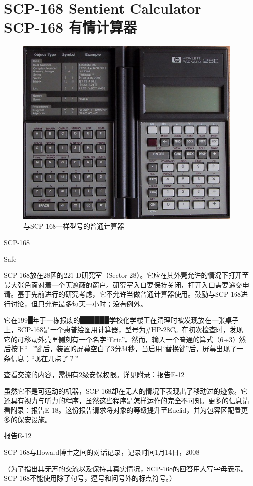 \chapter[SCP-168 有情计算器]{
    SCP-168 Sentient Calculator\\
    SCP-168 有情计算器
}

\label{chap:SCP-168}

\begin{figure}[H]
    \centering
    \includegraphics[width=0.5\linewidth]{images/SCP-168.jpg}
    \caption*{与SCP-168一样型号的普通计算器}
\end{figure}

SCP-168

Safe

SCP-168放在28区的221-D研究室（Sector-28）。它应在其外壳允许的情况下打开至最大张角面对着一个无遮蔽的窗户。研究室入口要保持关闭，打开入口需要递交申请。基于先前进行的研究考虑，它不允许当做普通计算器使用。鼓励与SCP-168进行讨论，但只允许最多每天一小时；没有例外。

它在199█年于一栋报废的██████学校化学楼正在清理时被发现放在一张桌子上，SCP-168是一个惠普绘图用计算器，型号为\#HP-28C。在初次检查时，发现它的可移动外壳里侧刻有一个名字“Eric”。然而，输入一个普通的算式（6÷3）然后按下“=”键后，装置的屏幕空白了3分34秒，当启用“替换键”后，屏幕出现了一条信息；“现在几点了？”

查看交流的内容，需拥有2级安保权限。详见附录：报告E-12

虽然它不是可运动的机器，SCP-168却在无人的情况下表现出了移动过的迹象。它还具有视力与听力的程序，虽然这些程序是怎样运作的完全不可知。更多的信息请看附录：报告E-18。这份报告请求将对象的等级提升至Euclid，并为包容区配置更多的保安设施。

报告E-12

SCP-168与Howard博士之间的对话记录，记录时间1月14日，2008

（为了指出其无声的交流以及保持其真实情况，SCP-168的回答用大写字母表示。SCP-168不能使用除了句号，逗号和问号外的标点符号。）

